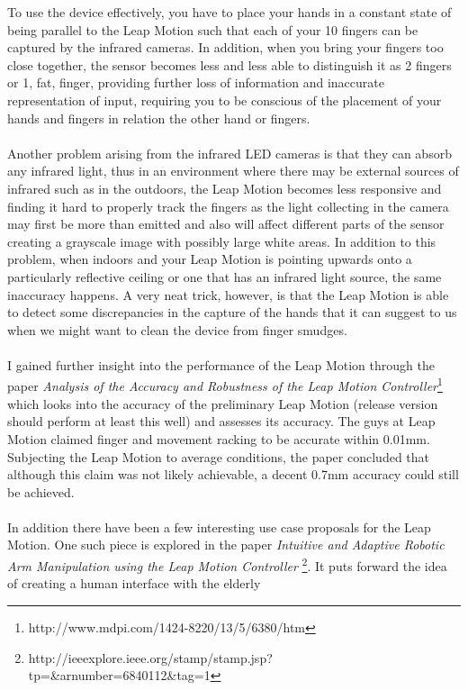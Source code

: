 \documentclass[11pt]{report}
\begin{document}
To use the device effectively, you have to place your hands in a constant 
state of being parallel to the Leap Motion such that each of your 10 fingers
can be captured by the infrared cameras. In addition, when you bring your fingers 
too close together, the sensor becomes less and less able to distinguish it 
as 2 fingers or 1, fat, finger, providing further loss of information and 
inaccurate representation of input, requiring you to be conscious of the placement
of your hands and fingers in relation the other hand or fingers.
\\ \\
Another problem arising from the infrared LED cameras is that they can absorb any
infrared light, thus in an environment where there may be external sources of 
infrared such as in the outdoors, the Leap Motion becomes less responsive and
finding it hard to properly track the fingers as the light collecting in the
camera may first be more than emitted and also will affect different parts of 
the sensor creating a grayscale image with possibly large white areas. In addition
to this problem, when indoors and your Leap Motion is pointing upwards onto a
particularly reflective ceiling or one that has an infrared light source, the same
inaccuracy happens. A very neat trick, however, is that the Leap Motion is able
to detect some discrepancies in the capture of the hands that it can suggest
to us when we might want to clean the device from finger smudges.
\\ \\
I gained further insight into the performance of the Leap Motion through the
paper \textit{Analysis of the Accuracy and Robustness of the Leap Motion 
Controller}\footnote{http://www.mdpi.com/1424-8220/13/5/6380/htm} which looks 
into the accuracy of the preliminary Leap Motion (release version should 
perform at least this well) and assesses its accuracy. The guys at Leap Motion 
claimed finger and movement racking to be accurate within 0.01mm. Subjecting the 
Leap Motion to average conditions, the paper concluded that although this 
claim was not likely achievable, a decent 0.7mm accuracy could still be
achieved.
\\ \\
In addition there have been a few interesting use case proposals for the
Leap Motion. One such piece is explored in the paper 
\textit{Intuitive and Adaptive Robotic Arm Manipulation using the Leap Motion Controller}
\footnote{http://ieeexplore.ieee.org/stamp/stamp.jsp?tp=\&arnumber=6840112\&tag=1}.
It puts forward the idea of creating a human interface with the elderly
\end{document}
